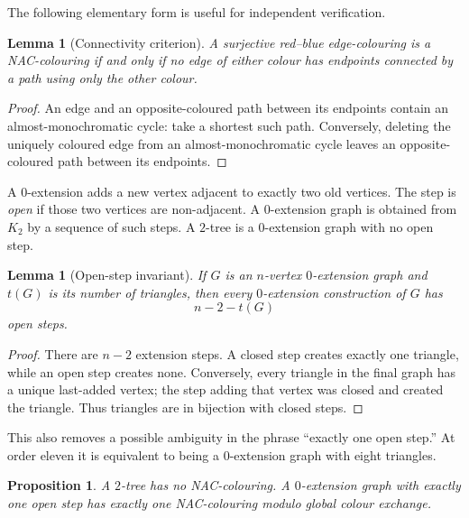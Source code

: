 \documentclass[11pt]{amsart}
\newtheorem{lemma}[theorem]{Lemma}
\newtheorem{proposition}[theorem]{Proposition}
\theoremstyle{definition}
\begin{document}
The following elementary form is useful for independent verification.

\begin{lemma}[Connectivity criterion]\label{lem:connectivity}
A surjective red--blue edge-colouring is a NAC-colouring if and only if no edge
of either colour has endpoints connected by a path using only the other
colour.
\end{lemma}

\begin{proof}
An edge and an opposite-coloured path between its endpoints contain an
almost-monochromatic cycle: take a shortest such path.  Conversely, deleting
the uniquely coloured edge from an almost-monochromatic cycle leaves an
opposite-coloured path between its endpoints.
\end{proof}

A $0$-extension adds a new vertex adjacent to exactly two old vertices.  The
step is \emph{open} if those two vertices are non-adjacent.  A $0$-extension
graph is obtained from $K_2$ by a sequence of such steps.  A $2$-tree is a
$0$-extension graph with no open step.

\begin{lemma}[Open-step invariant]\label{lem:open}
If $G$ is an $n$-vertex $0$-extension graph and $t(G)$ is its number of
triangles, then every $0$-extension construction of $G$ has
\[
 n-2-t(G)
\]
open steps.
\end{lemma}

\begin{proof}
There are $n-2$ extension steps.  A closed step creates exactly one triangle,
while an open step creates none.  Conversely, every triangle in the final
graph has a unique last-added vertex; the step adding that vertex was closed
and created the triangle.  Thus triangles are in bijection with closed steps.
\end{proof}

This also removes a possible ambiguity in the phrase ``exactly one open
step.''  At order eleven it is equivalent to being a $0$-extension graph with
eight triangles.

\begin{proposition}\label{prop:h1}
A $2$-tree has no NAC-colouring.  A $0$-extension graph with exactly one open
step has exactly one NAC-colouring modulo global colour exchange.
\end{proposition}
\end{document}
